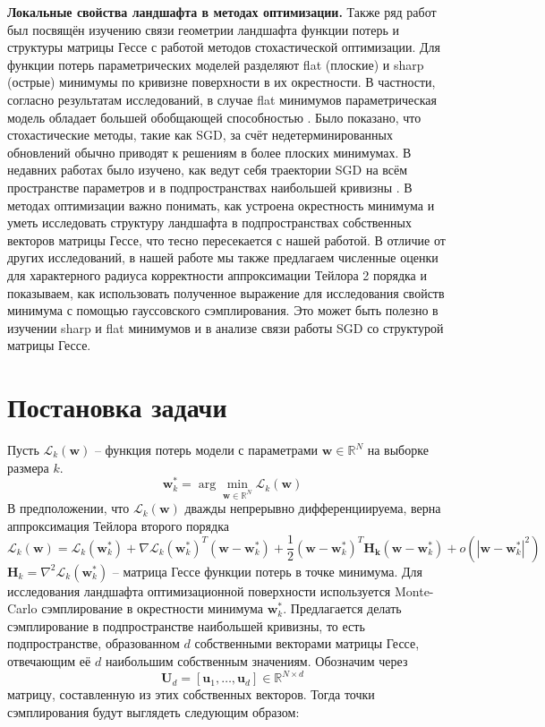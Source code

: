 \documentclass[11pt,a4paper]{article}
\begin{document}
\textbf{Локальные свойства ландшафта в методах оптимизации.}
Также ряд работ был посвящён изучению связи геометрии ландшафта функции потерь и структуры матрицы Гессе с работой методов стохастической оптимизации. 
Для функции потерь параметрических моделей разделяют flat (плоские) и sharp (острые) минимумы по кривизне поверхности в их окрестности\cite{hochreiter1997flat}.
В частности, согласно результатам исследований, в случае flat минимумов параметрическая модель обладает большей обобщающей способностью \cite{dinh2017sharp, foret2021sharpness, keskar2017largebatch}. \newline
Было показано, что стохастические методы, такие как SGD, за счёт недетерминированных обновлений обычно приводят к решениям в более плоских минимумах. В недавних работах было изучено, как ведут себя траектории SGD на всём пространстве параметров и в подпространствах наибольшей кривизны \cite{zhou2025bsfa, song2025sgdsubspace}. В методах оптимизации важно понимать, как устроена окрестность минимума и уметь исследовать структуру ландшафта в подпространствах собственных векторов матрицы Гессе, что тесно пересекается с нашей работой.
\newline
В отличие от других исследований, в нашей работе мы также предлагаем численные оценки для характерного радиуса корректности аппроксимации Тейлора 2 порядка и показываем, как использовать полученное выражение для исследования свойств минимума с помощью гауссовского сэмплирования. Это может быть полезно в изучении sharp и flat минимумов и в анализе связи работы SGD со структурой матрицы Гессе.

\section{Постановка задачи}
Пусть $\mathcal{L}_k(\mathbf{w})$ -- функция потерь модели с параметрами $\mathbf{w} \in \mathbb{R}^N$ на выборке размера $k$. \newline
{}
$$\mathbf{w}_k^* = \arg\min_{\mathbf{w} \in \mathbb{R}^N} \mathcal{L}_k(\mathbf{w})$$
В предположении, что $\mathcal{L}_k(\mathbf{w})$ дважды непрерывно дифференциируема, верна аппроксимация Тейлора второго порядка
$$\mathcal{L}_k(\mathbf{w}) = \mathcal{L}_k(\mathbf{w}_k^*)+
\nabla\mathcal{L}_k(\mathbf{w}_k^*)^T(\mathbf{w}-\mathbf{w}_k^*)+
\frac{1}{2}(\mathbf{w}-\mathbf{w}_k^*)^T\mathbf{H_k}(\mathbf{w}-\mathbf{w}_k^*)+
o(|\mathbf{w} - \mathbf{w}_k^*|^2)$$
$\mathbf{H}_k = \nabla^2 \mathcal{L}_k(\mathbf{w}_k^*)$ -- матрица Гессе функции потерь в точке минимума.\newline
Для исследования ландшафта оптимизационной поверхности используется Monte-Carlo сэмплирование в окрестности минимума $\mathbf{w}_k^{*}$.\newline
Предлагается делать сэмплирование в подпространстве наибольшей кривизны, то есть подпространстве, образованном $d$ собственными векторами матрицы Гессе, отвечающим её $d$ наибольшим собственным значениям. Обозначим через
$$\mathbf{U}_d = [\mathbf{u}_1, \dots, \mathbf{u}_d] \in \mathbb{R}^{N \times d}$$
матрицу, составленную из этих собственных векторов. \newline
Тогда точки сэмплирования будут выглядеть следующим образом:
\end{document}
